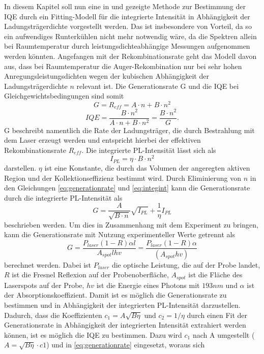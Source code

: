 \noindent
In diesem Kapitel soll nun eine in \cite{doi:10.1063/1.3100773} und \cite{doi:10.1063/1.4917540} gezeigte Methode zur Bestimmung der IQE durch ein Fitting-Modell für die integrierte Intensität in Abhängigkeit der Ladungsträgerdichte vorgestellt werden. Das ist insbesondere von Vorteil, da so ein aufwendiges Runterkühlen nicht mehr notwendig wäre, da die Spektren allein bei Raumtemperatur durch leistungsdichteabhängige Messungen aufgenommen werden könnten. 
\newline
Angefangen mit der Rekombinationsrate geht das Modell davon aus,
dass bei Raumtemperatur die Auger-Rekombination nur bei sehr hohen Anregungsleistungsdichten wegen der kubischen Abhängigkeit der Ladungsträgerdichte $n$ relevant ist. Die Generationsrate G und die IQE bei Gleichgewichtsbedingungen sind somit
\begin{equation}
    G = R_{eff} = A \cdot n + B \cdot n^2
    \label{eq:generationrate}
\end{equation}  
\begin{equation}
    IQE = \frac{B\cdot n^2}{A \cdot n + B \cdot n^2} = \frac{B\cdot n^2}{G}.
    \label{eq:iqe2}
\end{equation}  
G beschreibt namentlich die Rate der Ladungsträger, die durch Bestrahlung mit dem Laser erzeugt werden und entspricht hierbei der effektiven Rekombinationsrate $R_{eff}$.
Die integrierte PL-Intensität lässt sich als 
\begin{equation}
    I_{PL} = \eta \cdot B \cdot n^2
    \label{eq:integint}
\end{equation} 
darstellen. $\eta$ ist eine Konstante, die durch das Volumen der angeregten aktiven Region und der Kollektionseffizienz bestimmt wird. Durch Eliminierung von $n$ in den Gleichungen \ref{eq:generationrate} und \ref{eq:integint} kann die Generationsrate durch die integrierte PL-Intensität als
\begin{equation}
    G = \frac{A}{\sqrt{B\cdot n}}\sqrt{I_{PL}} + \frac{1}{\eta} I_{PL}
\end{equation} 
beschrieben werden. Um dies in Zusammenhang mit dem Experiment zu bringen, kann die Generationsrate mit Nutzung experimenteller Werte getrennt als
\begin{equation}
    G = \frac{P_{laser} (1-R)\alpha l}{A_{spot} l h v} = \frac{P_{laser}(1-R) \alpha }{ (A_{spot} h v)}
\end{equation} berechnet werden.
Dabei ist $P_{laser}$ die optische Leistung, die auf der Probe landet, $R$ ist die Fresnel Reflexion auf der Probenoberfläche, $A_{spot}$ ist die Fläche des Laserspots auf der Probe, $h v$ ist die Energie eines Photons mit $193 nm$ und $\alpha$ ist der Absorptionskoeffizient. Damit ist es möglich die Generationsrate zu bestimmen und in Abhängigkeit der integrierten PL-Intensität darzustellen. Dadurch, dass die Koeffizienten $c_1 = A \sqrt{B  \eta}$ und $c_2 = 1 / \eta$ durch einen Fit der Generationsrate in Abhängigkeit der integrierten Intensität extrahiert werden können, ist es möglich die IQE zu bestimmen. Dazu wird $c_1$ nach A umgestellt ($A = \sqrt{B \eta} \cdot c1$) und in \ref{eq:generationrate} eingesetzt, woraus sich 
